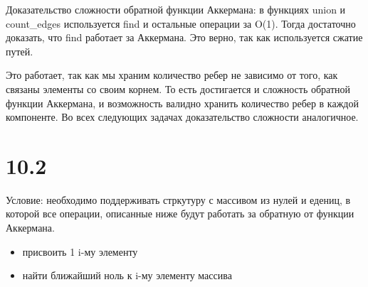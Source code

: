 \documentclass[12pt]{article}
\begin{document}
Доказательство сложности обратной функции Аккермана: в функциях union и count\_edges используется find и остальные операции за O(1). Тогда достаточно доказать, что find работает за Аккермана. Это верно, так как используется сжатие путей.

Это работает, так как мы храним количество ребер не зависимо от того, как связаны элементы со своим корнем. То есть достигается и сложность обратной функции Аккермана, и возможность валидно хранить количество ребер в каждой компоненте. Во всех следующих задачах доказательство сложности аналогичное.

\section{10.2}
Условие: необходимо поддерживать стркутуру с массивом из нулей и едениц, в которой все операции, описанные ниже будут работать за обратную от функции Аккермана.
\begin{itemize}
    \item присвоить 1 i-му элементу
    \item найти ближайший ноль к i-му элементу массива
\end{itemize}
\end{document}
